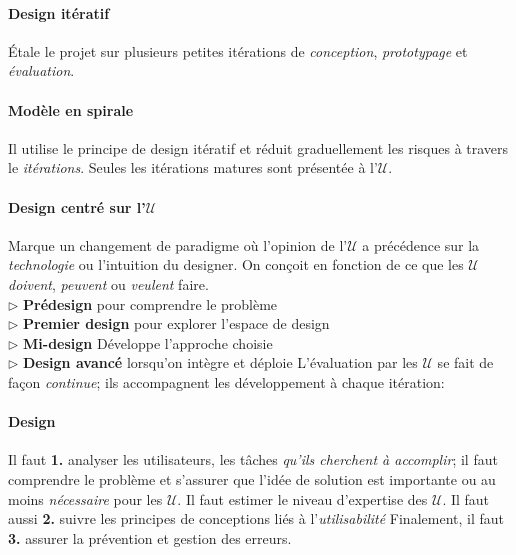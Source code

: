 \documentclass{report}
\begin{document}
\begin{multicols*}{3}
    \paragraph{Design itératif}
    Étale le projet sur plusieurs petites itérations
    de \textit{conception}, \textit{prototypage} et 
    \textit{évaluation}.  


    \paragraph{Modèle en spirale}
    Il utilise le principe de design itératif et réduit graduellement 
    les risques à travers le \textit{itérations}. 
    Seules les itérations matures sont présentée à l'$\mathcal{U}$. 

    \paragraph{Design centré sur l'$\mathcal{U}$ }
    Marque un changement de paradigme où l'opinion 
    de l'$\mathcal{U}$ a précédence sur la \textit{technologie}  
    ou l'intuition du designer. On conçoit en fonction de 
    ce que les $\mathcal{U}$ \textit{doivent}, \textit{peuvent} 
    ou \textit{veulent} faire.   \\
      \noindent
      $\rhd$ \textbf{Prédesign} pour comprendre le problème  
      \\
      $\rhd$ \textbf{Premier design} pour explorer l'espace de design  
      \\
      $\rhd$ \textbf{Mi-design} Développe l'approche choisie  
      \\
      $\rhd$ \textbf{Design avancé} lorsqu'on intègre et déploie   
    L'évaluation par les $\mathcal{U}$ se fait de façon \textit{continue}; 
    ils accompagnent les développement à chaque itération:

    
    \paragraph{Design}
    Il faut \textbf{1.}  analyser les utilisateurs, les tâches 
    \textit{qu'ils cherchent à accomplir}; il faut comprendre le problème 
    et s'assurer que l'idée de solution est importante ou au moins 
    \textit{nécessaire} pour les $\mathcal{U}$. Il faut estimer le 
    niveau d'expertise des $\mathcal{U}$. Il faut aussi \textbf{2.}  
    suivre les principes de conceptions liés à l'\textit{utilisabilité}  
    Finalement, il faut \textbf{3.} assurer la prévention 
    et gestion des erreurs. 


\end{multicols*}
\end{document}
